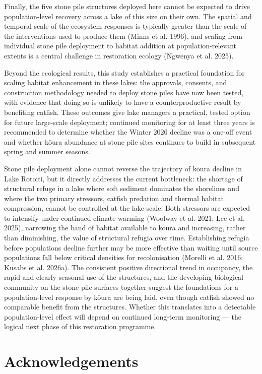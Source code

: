 \documentclass[
  12pt,
  a4paper,
  oneside]{scrbook}
\begin{document}
Finally, the five stone pile structures deployed here cannot be expected
to drive population-level recovery across a lake of this size on their
own. The spatial and temporal scale of the ecosystem responses is
typically greater than the scale of the interventions used to produce
them (Minns et al. 1996), and scaling from individual stone pile
deployment to habitat addition at population-relevant extents is a
central challenge in restoration ecology (Ngwenya et al. 2025).

Beyond the ecological results, this study establishes a practical
foundation for scaling habitat enhancement in these lakes: the
approvals, consents, and construction methodology needed to deploy stone
piles have now been tested, with evidence that doing so is unlikely to
have a counterproductive result by benefiting catfish. These outcomes
give lake managers a practical, tested option for future large-scale
deployment; continued monitoring for at least three years is recommended
to determine whether the Winter 2026 decline was a one-off event and
whether kōura abundance at stone pile sites continues to build in
subsequent spring and summer seasons.

Stone pile deployment alone cannot reverse the trajectory of kōura
decline in Lake Rotoiti, but it directly addresses the current
bottleneck: the shortage of structural refuge in a lake where soft
sediment dominates the shorelines and where the two primary stressors,
catfish predation and thermal habitat compression, cannot be controlled
at the lake scale. Both stressors are expected to intensify under
continued climate warming (Woolway et al. 2021; Lee et al. 2025),
narrowing the band of habitat available to kōura and increasing, rather
than diminishing, the value of structural refugia over time.
Establishing refugia before populations decline further may be more
effective than waiting until source populations fall below critical
densities for recolonisation (Morelli et al. 2016; Kusabs et al. 2026a).
The consistent positive directional trend in occupancy, the rapid and
clearly seasonal use of the structures, and the developing biological
community on the stone pile surfaces together suggest the foundations
for a population-level response by kōura are being laid, even though
catfish showed no comparable benefit from the structures. Whether this
translates into a detectable population-level effect will depend on
continued long-term monitoring --- the logical next phase of this
restoration programme.

\section{Acknowledgements}\label{acknowledgements-4}
\end{document}

